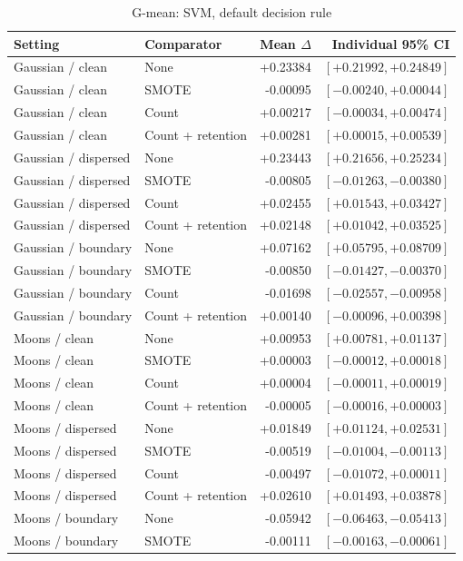 \begin{table}[htbp]
\caption{G-mean: SVM, default decision rule}
\centering\small
\begin{tabular}{llrr}
\hline
Setting & Comparator & Mean $\Delta$ & Individual 95\% CI\\
\hline
Gaussian / clean & None & +0.23384 & $[+0.21992, +0.24849]$ \\
Gaussian / clean & SMOTE & -0.00095 & $[-0.00240, +0.00044]$ \\
Gaussian / clean & Count & +0.00217 & $[-0.00034, +0.00474]$ \\
Gaussian / clean & Count + retention & +0.00281 & $[+0.00015, +0.00539]$ \\
Gaussian / dispersed & None & +0.23443 & $[+0.21656, +0.25234]$ \\
Gaussian / dispersed & SMOTE & -0.00805 & $[-0.01263, -0.00380]$ \\
Gaussian / dispersed & Count & +0.02455 & $[+0.01543, +0.03427]$ \\
Gaussian / dispersed & Count + retention & +0.02148 & $[+0.01042, +0.03525]$ \\
Gaussian / boundary & None & +0.07162 & $[+0.05795, +0.08709]$ \\
Gaussian / boundary & SMOTE & -0.00850 & $[-0.01427, -0.00370]$ \\
Gaussian / boundary & Count & -0.01698 & $[-0.02557, -0.00958]$ \\
Gaussian / boundary & Count + retention & +0.00140 & $[-0.00096, +0.00398]$ \\
Moons / clean & None & +0.00953 & $[+0.00781, +0.01137]$ \\
Moons / clean & SMOTE & +0.00003 & $[-0.00012, +0.00018]$ \\
Moons / clean & Count & +0.00004 & $[-0.00011, +0.00019]$ \\
Moons / clean & Count + retention & -0.00005 & $[-0.00016, +0.00003]$ \\
Moons / dispersed & None & +0.01849 & $[+0.01124, +0.02531]$ \\
Moons / dispersed & SMOTE & -0.00519 & $[-0.01004, -0.00113]$ \\
Moons / dispersed & Count & -0.00497 & $[-0.01072, +0.00011]$ \\
Moons / dispersed & Count + retention & +0.02610 & $[+0.01493, +0.03878]$ \\
Moons / boundary & None & -0.05942 & $[-0.06463, -0.05413]$ \\
Moons / boundary & SMOTE & -0.00111 & $[-0.00163, -0.00061]$ \\

\end{tabular}
\end{table}
